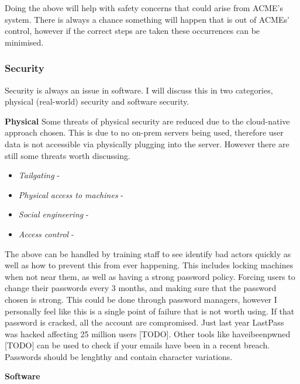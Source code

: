   Doing the above will help with safety concerns that could arise from ACME's system. There is always a chance something will happen that is out of 
  ACMEs' control, however if the correct steps are taken these occurrences can be minimised.

  \subsubsection{Security}
  Security is always an issue in software. I will discuss this in two categories, physical (real-world) security and software security.

  \textbf{Physical}
  \vspace{0.2cm}
  Some threats of physical security are reduced due to the cloud-native approach chosen. This is due to no on-prem servers being used, therefore 
  user data is not accessible via physically plugging into the server. However there are still some threats worth discussing.

  \begin{itemize}
    \item \textit{Tailgating} - 
    \item \textit{Physical access to machines} -
    \item \textit{Social engineering} -
    \item \textit{Access control} - 
  \end{itemize}

  The above can be handled by training staff to see identify bad actors quickly as well as how to prevent this from ever happening. This includes locking 
  machines when not near them, as well as having a strong password policy. Forcing users to change their passwords every 3 months, and making sure that the 
  password chosen is strong. This could be done through password managers, however I personally feel like this is a single point of failure that is not
  worth using. If that password is cracked, all the account are compromised. Just last year LastPass was hacked affecting 25 million users [TODO]. Other
  tools like haveibeenpwned [TODO] can be used to check if your emails have been in a recent breach. Passwords should be lenghthy and contain character
  variations.

  \textbf{Software}
  \vspace{0.2cm}


\newpage
